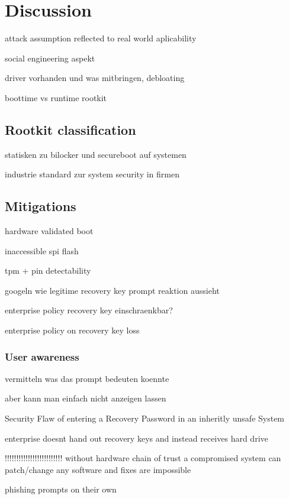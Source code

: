 

\chapter{Discussion}

attack assumption reflected to real world aplicability

social engineering aspekt

driver vorhanden und was mitbringen, debloating

boottime vs runtime rootkit

\section{Rootkit classification}

statisken zu bilocker und secureboot auf systemen

industrie standard zur system security in firmen

\section{Mitigations}

hardware validated boot

inaccessible spi flash

tpm + pin detectability

googeln wie legitime recovery key prompt reaktion aussieht

enterprise policy recovery key einschraenkbar?

enterprise policy on recovery key loss


\subsection{User awareness}

vermitteln was das prompt bedeuten koennte

aber kann man einfach nicht anzeigen lassen

Security Flaw of entering a Recovery Password in an inheritly unsafe System

enterprise doesnt hand out recovery keys and instead receives hard drive


!!!!!!!!!!!!!!!!!!!!!!!!!
without hardware chain of trust a compromised system can patch/change any software and fixes are impossible

phishing prompts on their own